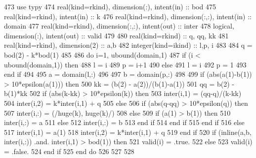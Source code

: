 \begin{DoxyCode}
473     \textcolor{keywordtype}{use }typy
474     \textcolor{keywordtype}{real(kind=rkind)}, \textcolor{keywordtype}{dimension(:)}, \textcolor{keywordtype}{intent(in)} :: bod
475     \textcolor{keywordtype}{real(kind=rkind)}, \textcolor{keywordtype}{intent(in)} :: k
476     \textcolor{keywordtype}{real(kind=rkind)}, \textcolor{keywordtype}{dimension(:,:)}, \textcolor{keywordtype}{intent(in)} :: domain
477     \textcolor{keywordtype}{real(kind=rkind)}, \textcolor{keywordtype}{dimension(:,:)}, \textcolor{keywordtype}{intent(out)} :: inter
478     \textcolor{keywordtype}{logical}, \textcolor{keywordtype}{dimension(:)}, \textcolor{keywordtype}{intent(out)} :: valid
479     
480     \textcolor{keywordtype}{real(kind=rkind)} :: q, qq, kk
481     \textcolor{keywordtype}{real(kind=rkind)}, \textcolor{keywordtype}{dimension(2)} :: a,b
482     \textcolor{keywordtype}{integer(kind=ikind)} :: l,p, i
483     
484     q = bod(2) - k*bod(1)
485     
486     \textcolor{keywordflow}{do} i=1, ubound(domain,1)
487       \textcolor{keywordflow}{if} (i < ubound(domain,1)) \textcolor{keywordflow}{then}
488         l = i
489         p = i+1
490       \textcolor{keywordflow}{else}
491         l = i
492         p = 1
493 \textcolor{keywordflow}{      end if} 
494       
495       a = domain(l,:)
496     
497       b = domain(p,:)
498       
499       \textcolor{keywordflow}{if} (abs(a(1)-b(1)) > 10*epsilon(a(1))) \textcolor{keywordflow}{then}
500         kk = (b(2) - a(2))/(b(1)-a(1))
501         qq = b(2) - b(1)*kk
502         \textcolor{keywordflow}{if} (abs(k-kk) > 10*epsilon(k)) \textcolor{keywordflow}{then}
503           inter(i,1) = (qq-q)/(k-kk)
504           inter(i,2) = k*inter(i,1) + q
505         \textcolor{keywordflow}{else}
506           \textcolor{keywordflow}{if} (abs(q-qq) > 10*epsilon(q)) \textcolor{keywordflow}{then}
507             inter(i,:) = (/huge(k), huge(k)/)
508           \textcolor{keywordflow}{else}
509             \textcolor{keywordflow}{if} (a(1) > b(1)) \textcolor{keywordflow}{then}
510               inter(i,:) = a
511             \textcolor{keywordflow}{else}
512               inter(i,:) = b
513 \textcolor{keywordflow}{            end if}
514 \textcolor{keywordflow}{          end if}
515 \textcolor{keywordflow}{        end if}
516       \textcolor{keywordflow}{else}
517         inter(i,1) = a(1)
518         inter(i,2) = k*inter(i,1) + q
519 \textcolor{keywordflow}{      end if}
520       \textcolor{keywordflow}{if} (inline(a,b, inter(i,:)) .and. inter(i,1) > bod(1)) \textcolor{keywordflow}{then}
521         valid(i) = .true.
522       \textcolor{keywordflow}{else}
523         valid(i) = .false.
524 \textcolor{keywordflow}{      end if}
525 \textcolor{keywordflow}{    end do}
526     
527  
528         
\end{DoxyCode}


